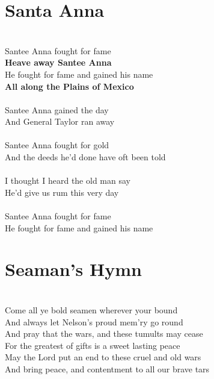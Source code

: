 \documentclass[letterpaper,14pt]{extarticle}
\begin{document}
\section{Santa Anna}
\noindent
\\Santee Anna fought for fame
\\\textbf{Heave away Santee Anna}
\\He fought for fame and gained his name
\\\textbf{All along the Plains of Mexico}
\\
\\Santee Anna gained the day
\\And General Taylor ran away
\\
\\Santee Anna fought for gold
\\And the deeds he'd done have oft been told
\\
\\I thought I heard the old man say
\\He'd give us rum this very day
\\
\\Santee Anna fought for fame
\\He fought for fame and gained his name

\section{Seaman's Hymn}
\noindent
\\Come all ye bold seamen wherever your bound
\\And always let Nelson's proud mem'ry go round
\\And pray that the wars, and these tumults may cease
\\For the greatest of gifts is a sweet lasting peace
\\May the Lord put an end to these cruel and old wars
\\And bring peace, and contentment to all our brave tars
\end{document}
